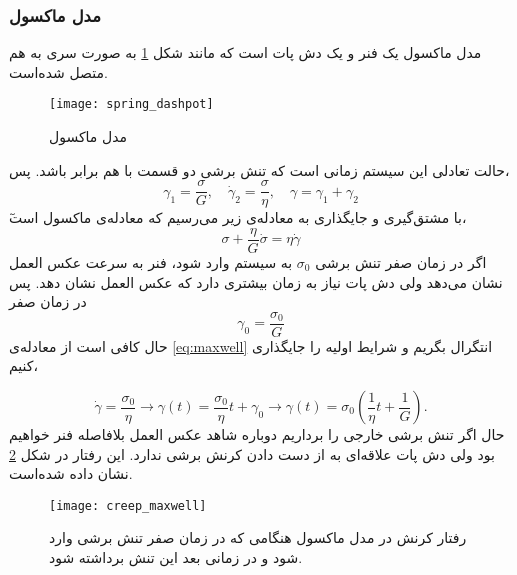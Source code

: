 \subsubsection{مدل ماکسول}
مدل ماکسول یک فنر و یک دش پات است که مانند شکل \ref{fig:SD} به صورت سری به هم متصل شده‌است.

\begin{figure}[htbp]
\begin{center}
\texttt{[image: spring\_dashpot]}
\caption{
مدل ماکسول
}
\label{fig:SD}
\end{center}
\end{figure}

حالت تعادلی این سیستم زمانی است که تنش برشی دو قسمت با هم برابر باشد. پس،
\begin{equation}
\gamma_1=\frac{\sigma}{G}, \quad \dot\gamma_2=\frac{\sigma}{\eta}, \quad \gamma=\gamma_1+\gamma_2
\end{equation}
ٓبا مشتق‌گیری و جایگذاری به معادله‌ی زیر می‌رسیم که معادله‌ی ماکسول است،
\begin{equation}
\sigma+\frac{\eta}{G}\dot\sigma=\eta\dot\gamma
\label{eq:maxwell}
\end{equation}
اگر در زمان صفر تنش برشی $\sigma_0$ به سیستم وارد شود، فنر به سرعت عکس العمل نشان می‌دهد ولی دش پات نیاز به زمان بیشتری دارد که عکس العمل نشان دهد. پس در زمان صفر
\begin{equation}
\gamma_0=\frac{\sigma_0}{G}
\end{equation}
حال کافی‌ است از  معادله‌ی \ref{eq:maxwell}  انتگرال بگریم و شرایط اولیه را جایگذاری کنیم،

\begin{equation}
\dot\gamma=\frac{\sigma_0}{\eta}\rightarrow \gamma(t)=\frac{\sigma_0}{\eta}t+\gamma_0\rightarrow \gamma(t)=\sigma_0\left(\frac{1}{\eta}t+\frac{1}{G}\right).
\end{equation}
حال اگر تنش برشی خارجی را برداریم دوباره شاهد عکس العمل بلافاصله فنر خواهیم بود ولی دش پات علاقه‌ای به از دست دادن کرنش برشی ندارد. این رفتار در شکل \ref{fig:creep_maxwell} نشان داده شده‌است.

\begin{figure}[htbp]
\begin{center}
\texttt{[image: creep\_maxwell]}
\caption{
رفتار کرنش در مدل ماکسول هنگامی که در زمان صفر تنش برشی وارد شود و در زمانی بعد این تنش برداشته شود.
}
\label{fig:creep_maxwell}
\end{center}
\end{figure}

